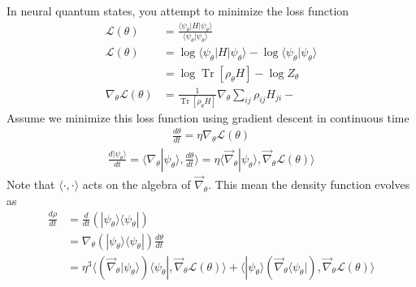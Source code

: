 \documentclass[12pt,fleqn]{article}
\numberwithin{equation}{section} %
\DeclareMathOperator{\Tr}{Tr}
\begin{document}
In neural quantum states, you attempt to minimize the loss function
\begin{align}
	\mathcal L(\theta) & = \frac{\langle \psi_\theta| H| \psi_\theta \rangle }{\langle \psi_\theta | \psi_\theta\rangle}\\
	\mathcal L(\theta) &= \log \langle \psi_\theta | H| \psi_\theta \rangle - \log \langle \psi_\theta | \psi_\theta\rangle \\
	& = \log \Tr[\rho_\theta H] - \log Z_\theta\\
	\nabla_\theta \mathcal L(\theta) & = \frac{1}{\Tr[\rho_\theta H]} \nabla_\theta \sum_{ij} \rho_{ij} H_{ji} - 
\end{align}
Assume we minimize this loss function using gradient descent in continuous time 
\begin{align}
	\frac{d\theta}{dt} = \eta \nabla_\theta \mathcal L(\theta)	
\end{align}
\begin{align}
	\frac{d|\psi_\theta \rangle}{dt} = \Big \langle \nabla_\theta |\psi_\theta \rangle , \frac{d\theta}{dt}  \Big \rangle  = \eta  \Big \langle \vec \nabla_\theta |\psi_\theta \rangle , \vec \nabla_\theta \mathcal L(\theta)  \Big \rangle 
\end{align}
Note that $\langle \cdot, \cdot \rangle$ acts on the algebra of $\vec \nabla_\theta$. This mean the density function evolves as 
\begin{align}
	\frac{d\rho}{dt} & = \frac{d}{dt} (|\psi_\theta\rangle \langle \psi_\theta |) \\
	& = \nabla_\theta (|\psi_\theta\rangle \langle \psi_\theta |) \frac{d\theta}{dt}  \\
	& = \eta^3 \Big \langle \left( \vec \nabla_\theta |\psi_\theta \rangle\right)\langle \psi_\theta | , \vec \nabla_\theta \mathcal L(\theta)  \Big \rangle  + \Big \langle | \psi_\theta \rangle \left( \vec \nabla_\theta \langle \psi_\theta | \right), \vec \nabla_\theta \mathcal L(\theta)  \Big \rangle 
\end{align}
\end{document}
